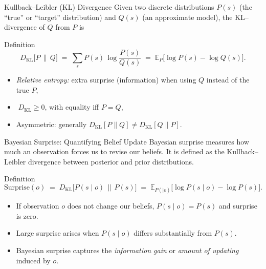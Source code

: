 \documentclass[aspectratio=1610, english]{beamer}
\begin{document}
\begin{frame}{Kullback–Leibler (KL) Divergence}
Given two discrete distributions \(P(s)\) (the “true” or “target” distribution) and \(Q(s)\) (an approximate model), the KL–divergence of \(Q\) from \(P\) is
\begin{block}{Definition}
\[
  D_{\mathrm{KL}}\bigl[P \,\|\, Q\bigr]
  \;=\;\sum_{s} P(s)\,\log\frac{P(s)}{Q(s)}
  \;=\;\mathbb{E}_{P}\bigl[\log P(s)-\log Q(s)\bigr].
\]
\end{block}

\begin{itemize}
\item \emph{Relative entropy:} extra surprise (information) when using \(Q\) instead of the true \(P\),
\item \(\;D_{\mathrm{KL}}\ge0\), with equality iff \(P=Q\), 
\item Asymmetric: generally \(D_{\mathrm{KL}}[P\|Q]\neq D_{\mathrm{KL}}[Q\|P]\).
\end{itemize}

\end{frame}
\begin{frame}{Bayesian Surprise: Quantifying Belief Update}
Bayesian surprise measures how much an observation forces us to revise our beliefs.  It is defined as the Kullback–Leibler divergence between posterior and prior distributions.
\begin{block}{Definition}
\[
  \text{Surprise}(o)
  \;=\;D_{\mathrm{KL}}\bigl[P(s\mid o)\,\|\,P(s)\bigr]
  \;=\;\mathbb{E}_{P(\mid o)}\bigl[\log P(s\mid o)-\log P(s)\bigr].
\]
\end{block}

\begin{itemize}
  \item If observation \(o\) does not change our beliefs, \(P(s\mid o)=P(s)\) and surprise is zero.
  \item Large surprise arises when \(P(s\mid o)\) differs substantially from \(P(s)\).
  \item Bayesian surprise captures the \emph{information gain} or \emph{amount of updating} induced by \(o\).
\end{itemize}

\end{frame}
\end{document}
